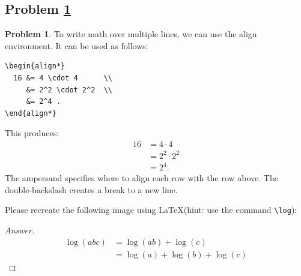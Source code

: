 \documentclass[11pt]{article}
\theoremstyle{definition}
\theoremstyle{definition}
\newtheorem{required}{Problem}
\theoremstyle{definition}
\begin{document}
\newpage
\subsection{Problem \ref{Latex4}}
\begin{required} \label{Latex4}
To write math over multiple lines, we can use the align environment.
It can be used as follows:
\begin{verbatim}
\begin{align*}
  16 &= 4 \cdot 4      \\
     &= 2^2 \cdot 2^2  \\
     &= 2^4 .
\end{align*}
\end{verbatim}
This produces:
\begin{align*}
  16 &= 4 \cdot 4      \\
     &= 2^2 \cdot 2^2  \\
     &= 2^4 .
\end{align*}
The ampersand specifies where to align each row with the row above. The double-backslash creates a break to a new line.

Please recreate the following image using \LaTeX (hint: use the command \texttt{\textbackslash log}):

\begin{center}
\end{center}
\end{required}

\begin{proof}[Answer]
\begin{align*}
   \log(abc) &= \log(ab) + \log(c) \\
   &= \log(a) + \log(b) + \log(c)
\end{align*}
\end{proof}



\end{document}
